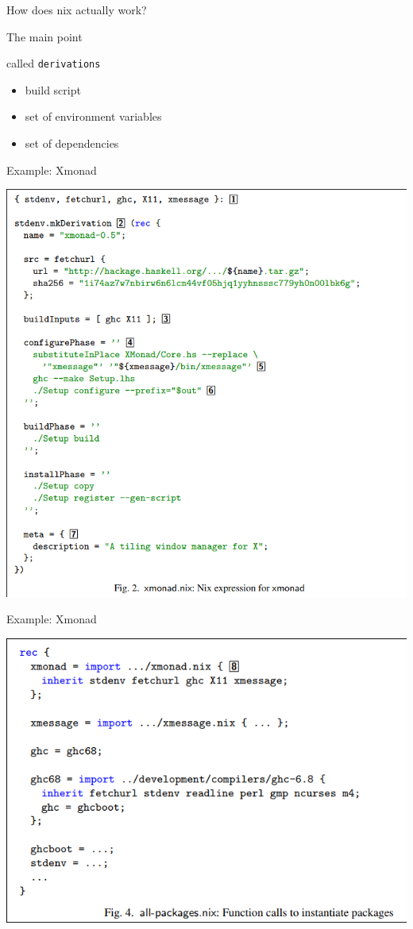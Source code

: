 \documentclass[presentation]{beamer}
\begin{document}
\begin{frame}[label={sec:org6d29320},fragile]{How does nix actually work?}
\begin{block}{The main point}
\begin{itemize}
called \texttt{derivations}
\begin{itemize}
\item build script
\item set of environment variables
\item set of dependencies
\end{itemize}
\end{itemize}
\end{block}
\begin{block}{Example: Xmonad}
\begin{center}
\includegraphics[width=.9\linewidth]{./images/screenshot-06.png}
\end{center}
\end{block}
\begin{block}{Example: Xmonad}
\begin{center}
\includegraphics[width=.9\linewidth]{./images/screenshot-07.png}

\end{center}
\end{block}
\end{frame}
\end{document}
